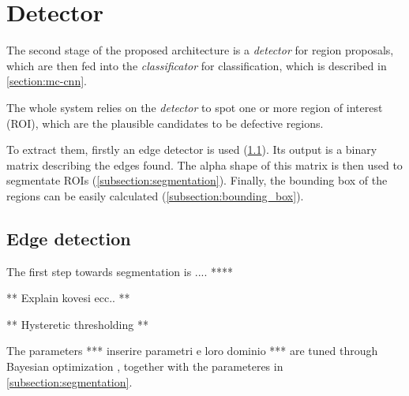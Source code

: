 \section{Detector}\label{section:region_proposals}
    \par{
        The second stage of the proposed architecture is a \emph{detector} for region proposals, which are then fed into the \emph{classificator} for classification, which is described in \ref{section:mc-cnn}.
    }
    \par{
        The whole system relies on the \emph{detector} to spot one or more region of interest (ROI), which are the plausible candidates to be defective regions.
    }
    \par{
        To extract them, firstly an edge detector is used (\ref{subsection:contour_detection}). Its output is a binary matrix describing the edges found. The alpha shape of this matrix is then used to segmentate ROIs (\ref{subsection:segmentation}). Finally, the bounding box of the regions can be easily calculated (\ref{subsection:bounding_box}).
    }
    \subsection{Edge detection}\label{subsection:contour_detection}
        \par{
            The first step towards segmentation is .... ****
        }
        \par{
            ** Explain kovesi ecc.. **
        }
        \par{
            ** Hysteretic thresholding **
        }
        \par{
            The parameters *** inserire parametri e loro dominio *** are tuned through Bayesian optimization  \cite{arXiv:2012arXiv1206.2944S,arXiv:2018arXiv180702811F, matlab:bayesian-opt}, together with the parameteres in \ref{subsection:segmentation}.
        }
